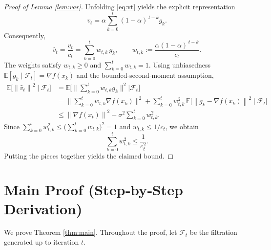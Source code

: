 \documentclass{article}
\newcommand{\E}{\mathbb{E}}
\newcommand{\norm}[1]{\left\lVert#1\right\rVert}
\begin{document}
\begin{proof}[Proof of Lemma \ref{lem:var}]
Unfolding \eqref{eq:vt} yields the explicit representation
\[
v_t=\alpha\sum_{k=0}^{t}(1-\alpha)^{\,t-k}g_k .
\]
Consequently,
\[
\hat v_t=\frac{v_t}{c_t}
       =\sum_{k=0}^{t}w_{t,k}\,g_k,
\qquad
w_{t,k}:=\frac{\alpha(1-\alpha)^{\,t-k}}{c_t}.
\]
The weights satisfy $w_{t,k}\ge0$ and $\sum_{k=0}^{t}w_{t,k}=1$.
Using unbiasedness $\E[g_k\mid\mathcal{F}_t]=\nabla f(x_k)$ and the bounded‑second‑moment
assumption,
\[
\begin{aligned}
\E\!\big[\norm{\hat v_t}^2\mid\mathcal{F}_t\big]
&=\E\!\Big[\Big\|\sum_{k=0}^{t}w_{t,k}g_k\Big\|^{2}\Big|\mathcal{F}_t\Big]  \\
&=\Big\|\sum_{k=0}^{t}w_{t,k}\nabla f(x_k)\Big\|^{2}
   +\sum_{k=0}^{t}w_{t,k}^{2}\,\E\!\big[\norm{g_k-\nabla f(x_k)}^{2}\mid\mathcal{F}_t\big] \\
&\le \norm{\nabla f(x_t)}^{2}
   +\sigma^{2}\sum_{k=0}^{t}w_{t,k}^{2} .
\end{aligned}
\]
Since $\sum_{k=0}^{t}w_{t,k}^{2}\le\big(\sum_{k=0}^{t}w_{t,k}\big)^{2}=1$ and
$w_{t,k}\le 1/c_t$, we obtain
\[
\sum_{k=0}^{t}w_{t,k}^{2}\le\frac{1}{c_t^{2}} .
\]
Putting the pieces together yields the claimed bound.
\end{proof}

\section*{Main Proof (Step‑by‑Step Derivation)}
We prove Theorem \ref{thm:main}. Throughout the proof, let $\mathcal{F}_t$ be the filtration generated up to iteration $t$.
\end{document}
